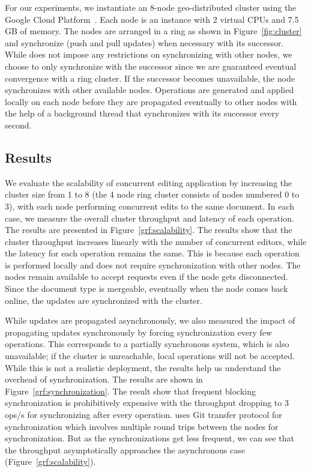 For our experiments, we instantiate an 8-node geo-distributed cluster
using the Google Cloud Platform~\cite{gcp}. Each node is an
 instance with 2 virtual CPUs and 7.5 GB of
memory. The nodes are arranged in a ring as shown in
Figure~\ref{fig:cluster} and synchronize (push and pull updates) when
necessary with its successor. While \name does not impose any
restrictions on synchronizing with other nodes, we choose to only
synchronize with the successor since we are guaranteed eventual
convergence with a ring cluster. If the successor becomes unavailable,
the node synchronizes with other available nodes. Operations are
generated and applied locally on each node before they are propagated
eventually to other nodes with the help of a background thread that
synchronizes with its successor every second.

\subsection{Results}

We evaluate the scalability of concurrent editing application by increasing the
cluster size from 1 to 8 (the 4 node ring cluster consists of nodes numbered 0
to 3), with each node performing concurrent edits to the same document. In each
case, we measure the overall cluster throughput and latency of each operation.
The results are presented in Figure~\ref{grf:scalability}. The results show
that the cluster throughput increases linearly with the number of concurrent
editors, while the latency for each operation remains the same. This is because
each operation is performed locally and does not require synchronization with
other nodes. The nodes remain available to accept requests even if the node
gets disconnected. Since the document type is mergeable, eventually when the
node comes back online, the updates are synchronized with the cluster.

While updates are propagated asynchronously, we also measured the impact of
propagating updates synchronously by forcing synchronization every few
operations. This corresponds to a partially synchronous system, which is also
unavailable; if the cluster is unreachable, local operations will not be
accepted. While this is not a realistic deployment, the results help us
understand the overhead of synchronization. The results are shown in
Figure~\ref{grf:synchronization}. The result show that frequent blocking
synchronization is prohibitively expensive with the throughput dropping to 3
ops/s for synchronizing after every operation. \name uses Git transfer protocol
for synchronization which involves multiple round trips between the nodes for
synchronization. But as the synchronizations get less frequent, we can see that
the throughput asymptotically approaches the asynchronous case
(Figure~\ref{grf:scalability}).

